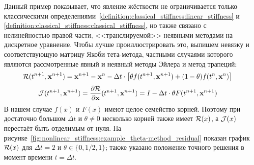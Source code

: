 Данный пример показывает, что явление жёсткости не ограничивается только
классическими определениями~\ref{definition:classical_stiffness:linear_stiffness}
и \ref{definition:classical_stiffness:classical_stiffness},
но также связано с нелинейностью правой части,
<<транслируемой>> неявными методами на дискретное уравнение.
Чтобы лучше проиллюстрировать это,
выпишем невязку и соответствующую матрицу Якоби тета-метода,
частными случаями которого являются рассмотренные явный и неявный методы Эйлера и метод трапеций:
%
\begin{equation}
    \label{eq:nonlinear_stiffness:theta-method_residual}
    \mathcal{R}(t^{n+1}, \mathbf{x}^{n+1}) = \mathbf{x}^{n+1} - \mathbf{x}^n -
    \Delta t \cdot \left[ \theta f(t^{n+1}, \mathbf{x}^{n+1}) + (1 - \theta) f(t^n, \mathbf{x}^n) \right]
\end{equation}
%
\begin{equation}
    \label{eq:nonlinear_stiffness:theta-method_jacobian}
    \mathcal{J}(t^{n+1}, \mathbf{x}^{n+1}) = \frac{\partial \mathcal{R}}{\partial \mathbf{x}}(t^{n+1}, \mathbf{x}^{n+1}) =
    I - \Delta t \cdot \theta F(t^{n+1}, \mathbf{x}^{n+1})
\end{equation}
%
В нашем случае $ f(x) $ и $ F(x) $ имеют целое семейство корней.
Поэтому при достаточно большом $ \Delta t $ и $ \theta \neq 0 $ несколько корней также имеет $ \mathcal{R}(x) $,
а $ \mathcal{J}(x) $ перестаёт быть отделимым от нуля.
На рисунке~\ref{fig:nonlinear_stiffness:example_theta-method_residual}
показан график $ \mathcal{R}(x) $ для $ \Delta t = 2 $ и $ \theta \in \{0, 1/2, 1\} $;
также указано положение точного решения в момент времени $ t = \Delta t $.

